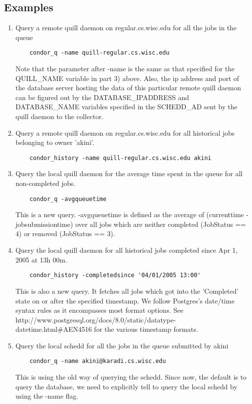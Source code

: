 \subsection{\label{sec:Quill-Example}Examples}


\begin{enumerate}
\item Query a remote quill daemon on regular.cs.wisc.edu for all the jobs in 
the queue
\begin{verbatim}
	condor_q -name quill-regular.cs.wisc.edu
\end{verbatim}
Note that the parameter after -name is the same as that specified for
the QUILL\_NAME variable in part 3) above.  Also, the ip address and port
of the database server hosting the data of this particular remote quill
daemon can be figured out by the DATABASE\_IPADDRESS and DATABASE\_NAME
variables specified in the SCHEDD\_AD sent by the quill daemon to the
collector.


\item Query a remote quill daemon on regular.cs.wisc.edu for all historical 
jobs belonging to owner 'akini'.
\begin{verbatim}
	condor_history -name quill-regular.cs.wisc.edu akini
\end{verbatim}

\item Query the local quill daemon for the average time spent in the queue 
for all non-completed jobs. 
\begin{verbatim}
	condor_q -avgqueuetime 
\end{verbatim}
This is a new query.  -avgqueuetime is defined as the average of 
(currenttime - jobsubmissiontime) over all jobs which are neither 
completed (JobStatus == 4) or removed (JobStatus == 3).

\item Query the local quill daemon for all historical jobs completed since 
Apr 1, 2005 at 13h 00m.
\begin{verbatim}
	condor_history -completedsince '04/01/2005 13:00'
\end{verbatim}
This is also a new query.  It fetches all jobs
which got into the 'Completed' state on or after the
specified timestamp.  We follow Postgres's date/time
syntax rules as it encompasses most format options.  See
http://www.postgresql.org/docs/8.0/static/datatype-datetime.html\#AEN4516
for the various timestamp formats.

\item Query the local schedd for all the jobs in the queue submitted by akini
\begin{verbatim}
	condor_q -name akini@karadi.cs.wisc.edu
\end{verbatim}
This is using the old way of querying the schedd.  Since now, the default
is to query the database, we need to explicitly tell  to query
the local schedd by using the -name flag.

\end{enumerate}

